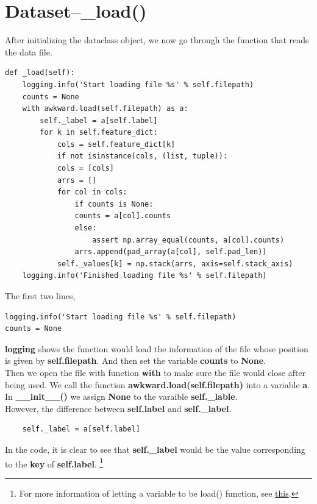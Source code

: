 \documentclass[12pt]{report}
\numberwithin{equation}{section}
\begin{document}
\section{Dataset--\_load()}

After initializing the dataclass object, we now go through the function that reads the data file.

\begin{lstlisting}
def _load(self):
    logging.info('Start loading file %s' % self.filepath)
    counts = None
    with awkward.load(self.filepath) as a:
        self._label = a[self.label]
        for k in self.feature_dict:
            cols = self.feature_dict[k]
            if not isinstance(cols, (list, tuple)):
            cols = [cols]
            arrs = []
            for col in cols:
                if counts is None:
                counts = a[col].counts
                else:
                    assert np.array_equal(counts, a[col].counts)
                arrs.append(pad_array(a[col], self.pad_len))
            self._values[k] = np.stack(arrs, axis=self.stack_axis)
    logging.info('Finished loading file %s' % self.filepath)
\end{lstlisting}

The first two lines,
\begin{lstlisting}
logging.info('Start loading file %s' % self.filepath)
counts = None
\end{lstlisting}

\textbf{logging} shows the function would load the information of the file whose position is given by \textbf{self.filepath}. And then set the variable \textbf{counts} to \textbf{None}. 
\\\indent Then we open the file with function \textbf{with} to make sure the file would close after being used. We call the function \textbf{awkward.load(self.filepath)} into a variable \textbf{a}.
 In \textbf{\_\_init\_\_()} we assign \textbf{None} to the varaible \textbf{self.\_lable}. 
\\\indent However, the difference between \textbf{self.label} and \textbf{self.\_label}.

\begin{lstlisting}
    self._label = a[self.label]
\end{lstlisting}

In the code, it is clear to see that \textbf{self.\_label} would be the value corresponding to the \textbf{key} of \textbf{self.label}.
\footnote{For more information of letting a variable to be load() function, see \hyperlink{https://stackoverflow.com/questions/66851761/best-way-to-save-a-dict-of-awkward1-arrays}{this}.}
\end{document}
